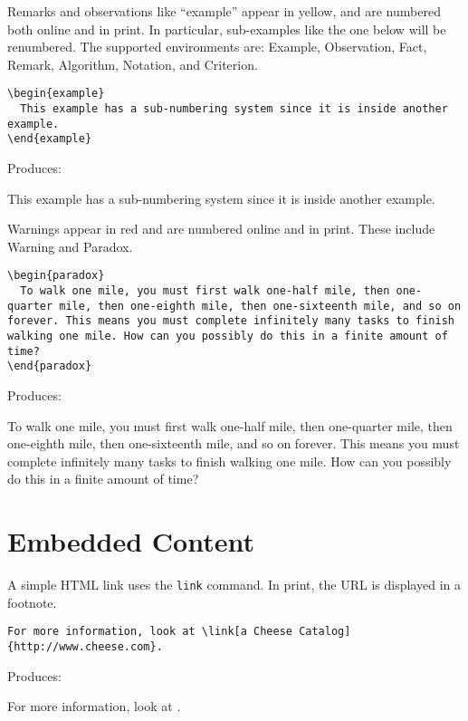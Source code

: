 \documentclass{ximera}
\begin{document}
\begin{example} Remarks and observations like ``example'' appear in yellow, and are numbered both online and in print. In particular, sub-examples like the one below will be renumbered. The supported environments are: Example, Observation, Fact, Remark, Algorithm, Notation, and Criterion.

\begin{verbatim}
\begin{example}
  This example has a sub-numbering system since it is inside another example.
\end{example}
\end{verbatim}

Produces:

\begin{example}
  This example has a sub-numbering system since it is inside another example.
\end{example}
\end{example}

\begin{example} Warnings appear in red and are numbered online and in print. These include Warning and Paradox.

\begin{verbatim}
\begin{paradox}
  To walk one mile, you must first walk one-half mile, then one-quarter mile, then one-eighth mile, then one-sixteenth mile, and so on forever. This means you must complete infinitely many tasks to finish walking one mile. How can you possibly do this in a finite amount of time?
\end{paradox}
\end{verbatim}

Produces:

\begin{paradox}
  To walk one mile, you must first walk one-half mile, then one-quarter mile, then one-eighth mile, then one-sixteenth mile, and so on forever. This means you must complete infinitely many tasks to finish walking one mile. How can you possibly do this in a finite amount of time?
\end{paradox}
\end{example}

\section{Embedded Content} \label{EmbeddedContent}

\begin{example} A simple HTML link uses the \verb!link! command. In print, the URL is displayed in a footnote.

\begin{verbatim}
For more information, look at \link[a Cheese Catalog]{http://www.cheese.com}.
\end{verbatim}

Produces:

For more information, look at .
\end{example}
\end{document}
